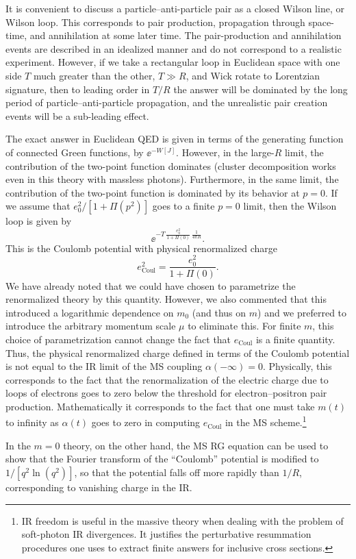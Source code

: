 It is convenient to discuss a particle--anti-particle pair as a closed Wilson
line, or Wilson loop. This corresponds to pair production, propagation through
space-time, and annihilation at some later time. The pair-production and
annihilation events are described in an idealized manner and do not correspond
to a realistic experiment. However, if we take a rectangular loop in Euclidean
space with one side $T$ much greater than the other, $T\gg R$, and Wick rotate
to Lorentzian signature, then to leading order in $T/R$ the answer will be
dominated by the long period of particle--anti-particle propagation, and the
unrealistic pair creation events will be a sub-leading effect.

The exact answer in Euclidean QED is given in terms of the generating function
of connected Green functions, by $\ee^{-W[J]}$. However, in the large-$R$ limit,
the contribution of the two-point function dominates (cluster decomposition
works even in this theory with massless photons). Furthermore, in the same
limit, the contribution of the two-point function is dominated by its behavior
at $p=0$. If we assume that $e_0^2/[1+\Pi(p^2)]$ goes to a finite $p=0$ limit,
then the Wilson loop is given by
\[
  \ee^{-T\,\frac{e_0^2}{1+\Pi(0)}\,\frac{1}{4\pi R}}.
\]
This is the Coulomb potential with physical renormalized charge
\[
  e_{\mathrm{Coul}}^2=\frac{e_0^2}{1+\Pi(0)}.
\]
We have already noted that we could have chosen to parametrize the renormalized
theory by this quantity. However, we also commented that this introduced a
logarithmic dependence on $m_0$ (and thus on $m$) and we preferred to introduce
the arbitrary momentum scale $\mu$ to eliminate this. For finite $m$, this
choice of parametrization cannot change the fact that $e_{\mathrm{Coul}}$ is a
finite quantity. Thus, the physical renormalized charge defined in terms of the
Coulomb potential is not equal to the IR limit of the MS coupling
$\alpha(-\infty)=0$. Physically, this corresponds to the fact that the
renormalization of the electric charge due to loops of electrons goes to zero
below the threshold for electron--positron pair production. Mathematically it
corresponds to the fact that one must take $m(t)$ to infinity as $\alpha(t)$
goes to zero in computing $e_{\mathrm{Coul}}$ in the MS scheme.\footnote[14]{IR
freedom is useful in the massive theory when dealing with the problem of
soft-photon IR divergences. It justifies the perturbative resummation
procedures one uses to extract finite answers for inclusive cross sections.}

In the $m=0$ theory, on the other hand, the MS RG equation can be used to show
that the Fourier transform of the ``Coulomb'' potential is modified to
$1/[q^2\ln(q^2)]$, so that the potential falls off more rapidly than $1/R$,
corresponding to vanishing charge in the IR.
